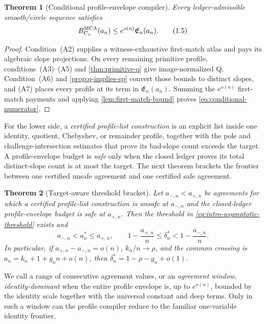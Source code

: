 \documentclass[12pt,a4paper]{amsart}
\numberwithin{equation}{section}
\newtheorem{theorem}{Theorem}[section]
\theoremstyle{remark}
\begin{document}
\begin{theorem}[Conditional profile-envelope compiler]
\label{thm:main-smooth-circle}
Every ledger-admissible smooth/circle sequence satisfies
\[
        B_{C_n}^{\rm MCA}(a_n)
        \le e^{o(n)}\mathfrak E_n(a_n).
        \tag{1.5}\label{eq:conditional-numerator}
\]
\end{theorem}

\begin{proof}
Condition~\textup{(A2)} supplies a witness-exhaustive first-match atlas
and pays its algebraic slope projections.  On every remaining primitive
profile, conditions~\textup{(A3)}--\textup{(A5)} and
\cref{thm:primitive-q} give image-normalized Q.  Condition~\textup{(A6)}
and \cref{prop:q-implies-sp} convert those bounds to distinct slopes, and
\textup{(A7)} places every profile at its term in
\(\mathfrak E_n(a_n)\).  Summing the \(e^{o(n)}\) first-match payments and
applying \cref{lem:first-match-bound} proves
\eqref{eq:conditional-numerator}.
\end{proof}

For the lower side, a \emph{certified profile-list construction} is an
explicit list inside one identity, quotient, Chebyshev, or remainder
profile, together with the pole and challenge-intersection estimates that
prove its bad-slope count exceeds the target.  A profile-envelope budget is
\emph{safe} only when the closed ledger proves its total distinct-slope
count is at most the target.  The next theorem brackets the frontier
between one certified unsafe agreement and one certified safe agreement.

\begin{theorem}[Target-aware threshold bracket]
\label{thm:intro-asymptotic-rs-mca}
Let \(a_{-,n}<a_{+,n}\) be agreements for which a certified profile-list
construction is unsafe at \(a_{-,n}\) and the closed-ledger
profile-envelope budget is safe at \(a_{+,n}\).  Then the threshold
in \eqref{eq:intro-asymptotic-threshold} exists and
\[
 a_{-,n}<a_n^*\le a_{+,n},\qquad
 1-\frac{a_{+,n}}n\le\delta_n^*<1-\frac{a_{-,n}}n.
 \tag{1.6}\label{eq:intro-threshold-bracket}
\]
In particular, if \(a_{+,n}-a_{-,n}=o(n)\), \(k_n/n\to\rho\), and the
common crossing is \(a_n=k_n+1+g_nn+o(n)\), then
\(\delta_n^*=1-\rho-g_n+o(1)\).
\end{theorem}

We call a range of consecutive agreement values, or an \emph{agreement
window}, \emph{identity-dominant} when the entire profile envelope
is, up to \(e^{o(n)}\), bounded by the identity scale together with the
universal constant and deep terms.  Only in such a window can the profile
compiler reduce to the familiar one-variable identity frontier.
\end{document}
